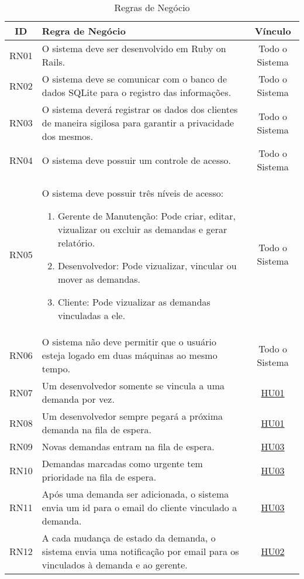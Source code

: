 \begin{table}[H]
	\begin{tabular}{|c|>{\centering}p{12cm}|c|}
		\hline 
		ID & Regra de Negócio & Vínculo\tabularnewline
		\hline 
		\hline 
		RN01 & O sistema deve ser desenvolvido em Ruby on Rails. & Todo o Sistema\tabularnewline
		\hline 
		RN02 & O sistema deve se comunicar com o banco de dados SQLite para o registro
		das informações. & Todo o Sistema\tabularnewline
		\hline 
		RN03 & O sistema deverá registrar os dados dos clientes de maneira sigilosa
		para garantir a privacidade dos mesmos. & Todo o Sistema\tabularnewline
		\hline 
		RN04 & O sistema deve possuir um controle de acesso. & Todo o Sistema\tabularnewline
		\hline 
		RN05 & O sistema deve possuir três níveis de acesso:
		\begin{enumerate}
			\item Gerente de Manutenção: Pode criar, editar, vizualizar ou excluir as demandas e gerar relatório.
			\item Desenvolvedor: Pode vizualizar, vincular ou mover as demandas.
			\item Cliente: Pode vizualizar as demandas vinculadas a ele.
		\end{enumerate} & Todo o Sistema\tabularnewline
		\hline 
		RN06 & O sistema não deve permitir que o usuário esteja logado em duas máquinas
		ao mesmo tempo. & Todo o Sistema\tabularnewline
		\hline 
		RN07 & Um desenvolvedor somente se vincula a uma demanda por vez. & \hyperref[HU01]{HU01}\tabularnewline
		\hline 
		RN08 & Um desenvolvedor sempre pegará a próxima demanda na fila de espera. & \hyperref[HU01]{HU01}\tabularnewline
		\hline 
		RN09 & Novas demandas entram na fila de espera. & \hyperref[HU03]{HU03}\tabularnewline
		\hline 
		RN10 & Demandas marcadas como urgente tem prioridade na fila de espera. & \hyperref[HU03]{HU03}\tabularnewline
		\hline 
		RN11 & Após uma demanda ser adicionada, o sistema envia um id para o email
		do cliente vinculado a demanda. & \hyperref[HU03]{HU03}\tabularnewline
		\hline 
		RN12 & A cada mudança de estado da demanda, o sistema envia uma notificação
		por email para os vinculados à demanda e ao gerente. & \hyperref[HU02]{HU02}\tabularnewline
		\hline 
	\end{tabular}
	\caption{Regras de Negócio}
	\label{Regra_de_Negocio}
\end{table}